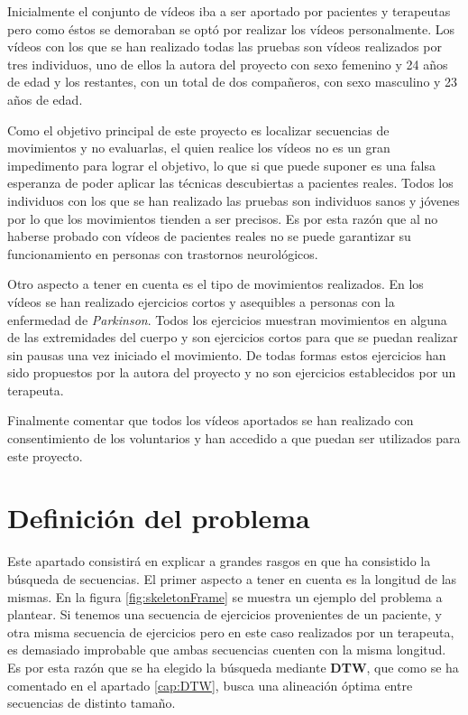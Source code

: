 Inicialmente el conjunto de vídeos iba a ser aportado por pacientes y terapeutas pero como éstos se demoraban se optó por realizar los vídeos personalmente. Los vídeos con los que se han realizado todas las pruebas son vídeos realizados por tres individuos, uno de ellos la autora del proyecto con sexo femenino y 24 años de edad y los restantes, con un total de dos compañeros, con sexo masculino y 23 años de edad. 

Como el objetivo principal de este proyecto es localizar secuencias de movimientos y no evaluarlas, el quien realice los vídeos no es un gran impedimento para lograr el objetivo, lo que si que puede suponer es una falsa esperanza de poder aplicar las técnicas descubiertas a pacientes reales. Todos los individuos con los que se han realizado las pruebas son individuos sanos y jóvenes por lo que los movimientos tienden a ser precisos. Es por esta razón que al no haberse probado con vídeos de pacientes reales no se puede garantizar su funcionamiento en personas con trastornos neurológicos. 

Otro aspecto a tener en cuenta es el tipo de movimientos realizados. En los vídeos se han realizado ejercicios cortos y asequibles a personas con la enfermedad de \textit{Parkinson}. Todos los ejercicios muestran movimientos en alguna de las extremidades del cuerpo y son ejercicios cortos para que se puedan realizar sin pausas una vez iniciado el movimiento. De todas formas estos ejercicios han sido propuestos por la autora del proyecto y no son ejercicios establecidos por un terapeuta. 

Finalmente comentar que todos los vídeos aportados se han realizado con consentimiento de los voluntarios y han accedido a que puedan ser utilizados para este proyecto. 


\section{Definición del problema} \label{cap:defProblem}

Este apartado consistirá en explicar a grandes rasgos en que ha consistido la búsqueda de secuencias. El primer aspecto a tener en cuenta es la longitud de las mismas. En la figura \ref{fig:skeletonFrame} se muestra un ejemplo del problema a plantear. Si tenemos una secuencia de ejercicios provenientes de un paciente, y otra misma secuencia de ejercicios pero en este caso realizados por un terapeuta, es demasiado improbable que ambas secuencias cuenten con la misma longitud. Es por esta razón que se ha elegido la búsqueda mediante \textbf{DTW}, que como se ha comentado en el apartado \ref{cap:DTW}, busca una alineación óptima entre secuencias de distinto tamaño. 


